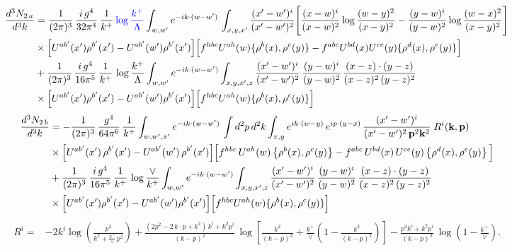 \documentclass[9pt]{article}
\numberwithin{equation}{section}
\begin{document}
\begin{align}
\frac{d^{3}N_{2\,a}}{d^{3}k} & = \frac{1}{(2\pi)^{3}}\,\frac{i\,g^{4}}{32\pi^{4}}\,\frac{1}{k^{+}}\,{\color{blue}\log\frac{k^{+}}{\Lambda}}\int_{w,w'} e^{-ik\cdot(w-w')}\,\int_{x,y,x'}\frac{(x'-w')^{i}}{(x'-w')^{2}}\Bigg[\frac{(x-w)^{i}}{(x-w)^{2}}\log\frac{(w-y)^{2}}{(x-y)^{2}}-\frac{(y-w)^{i}}{(y-w)^{2}}\log\frac{(w-x)^{2}}{(x-y)^{2}}\Bigg]\notag\\
&\times\Big[U^{ab'}(x')\rho^{b'}(x')-U^{ab'}(w')\rho^{b'}(x')\Big]\Big[f^{hbc}U^{ah}(w)\{\rho^{b}(x),\rho^{c}(y)\}-f^{abc}U^{bd}(x)U^{ce}(y)\{\rho^{d}(x),\rho^{e}(y)\}\Big] \notag\\ & +\frac{1}{(2\pi)^{3}}\,\frac{i\,g^{4}}{16\pi^{5}}\,\frac{1}{k^{+}}\,\log\frac{k^{+}}{\Lambda}\int_{w,w^{\prime}} e^{-ik\cdot(w-w^{\prime})}\int_{x,y,x^{\prime},z}\frac{(x^{\prime}-w^{\prime})^{i}}{(x^{\prime}-w^{\prime})^{2}}\,\frac{(y-w)^{i}}{(y-w)^{2}}\,\frac{(x-z)\cdot(y-z)}{(x-z)^{2}\,(y-z)^{2}} \notag\\ & \times\Big[U^{ab^{\prime}}(x^{\prime})\rho^{b^{\prime}}(x^{\prime})-U^{ab^{\prime}}(w^{\prime})\rho^{b^{\prime}}(x^{\prime})\Big]\Big[f^{hbc}U^{ah}(w)\{\rho^{b}(x),\rho^{c}(y)\}\Big]
\end{align}
\begin{align}
\frac{d^{3}N_{2\,b}}{d^{3}k} & = -\frac{1}{(2\pi)^{3}}\,\frac{g^{4}}{64\pi^{6}}\,\frac{1}{k^{+}}\int_{w,w',x'} e^{-ik\cdot(w-w')}\,
\int d^{2}p\,d^{2}k\int_{x,y} e^{ik\cdot(w-y)}\,e^{ip\cdot(y-x)}\,\frac{(x'-w')^{i}}{(x'-w')^{2}\,\mathbf{p}^{2}\mathbf{k}^{2}}\;R^{i}(\mathbf{k},\mathbf{p})\notag\\
&\times\Big[U^{ab'}(x')\,\rho^{b'}(x')-U^{ab'}(w')\,\rho^{b'}(x')\Big]
\Big[f^{hbc}\,U^{ah}(w)\left\{\rho^{b}(x),\rho^{c}(y)\right\}-f^{abc}\,U^{bd}(x)\,U^{ce}(y)\left\{\rho^{d}(x),\rho^{e}(y)\right\}\Big] \notag\\ & +\frac{1}{(2\pi)^{3}}\,\frac{i\,g^{4}}{16\pi^{5}}\,\frac{1}{k^{+}}\,\log\frac{\vee}{k^{+}}\int_{w,w^{\prime}} e^{-ik\cdot(w-w^{\prime})}\int_{x,y,x^{\prime},z}\frac{(x^{\prime}-w^{\prime})^{i}}{(x^{\prime}-w^{\prime})^{2}}\,\frac{(y-w)^{i}}{(y-w)^{2}}\,\frac{(x-z)\cdot(y-z)}{(x-z)^{2}\,(y-z)^{2}} \notag\\ & \times\Big[U^{ab^{\prime}}(x^{\prime})\rho^{b^{\prime}}(x^{\prime})-U^{ab^{\prime}}(w^{\prime})\rho^{b^{\prime}}(x^{\prime})\Big]\Big[f^{hbc}U^{ah}(w)\{\rho^{b}(x),\rho^{c}(y)\}\Big]
\end{align}
\begin{align}
R^{i} =& -2k^{i}\log\left(\frac{p^{2}}{k^{2}+\frac{k^{+}}{\vee}\,p^{2}}\right)
+\frac{(2p^{2}-2\,k\cdot p+k^{2})\,k^{i}+k^{2}p^{i}}{(k-p)^{2}}\,
\log\left[\frac{k^{2}}{(k-p)^{2}}+\frac{k^{+}}{\vee}\left(1-\frac{k^{2}}{(k-p)^{2}}\right)\right]
-\frac{p^{2}k^{i}+k^{2}p^{i}}{(k-p)^{2}}\,\log\left(1-\frac{k^{+}}{\vee}\right).
\end{align}
\end{document}
